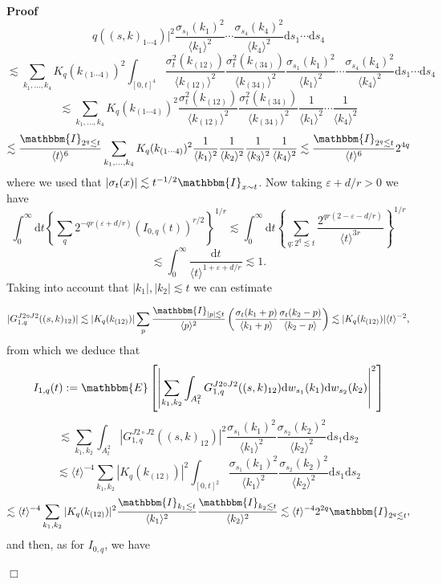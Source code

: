 \documentclass[11pt, oneside]{article}   	%
\newcommand{\assign}{:=}
\newcommand{\mathd}{\mathrm{d}}
\newenvironment{proof}{\noindent\textbf{Proof\ }}{\hspace*{\fill}$\Box$\medskip}
\begin{document}
\begin{proof}
\[{     q} ((s, k)_{1 \cdots 4}) |^2 \frac{\sigma_{s_1} (k_1)^2}{\langle k_1
     \rangle^2} \cdots \frac{\sigma_{s_4} (k_4)^2}{\langle k_4 \rangle^2}
     \mathd s_1 \cdots \mathd s_4 \]
  \[ \lesssim \sum_{k_1, \ldots, k_4} K_q (k_{(1 \cdots 4)})^2 \int_{[0, t]^4}
     \frac{\sigma_t^2 (k_{(12)})}{\langle k_{(12)} \rangle^2} \frac{\sigma_t^2
     (k_{(34)})}{\langle k_{(34)} \rangle^2} \frac{\sigma_{s_1}
     (k_1)^2}{\langle k_1 \rangle^2} \cdots \frac{\sigma_{s_4}
     (k_4)^2}{\langle k_4 \rangle^2} \mathd s_1 \cdots \mathd s_4 \]
  \[ \lesssim \sum_{k_1, \ldots, k_4} K_q (k_{(1 \cdots 4)})^2
     \frac{\sigma_t^2 (k_{(12)})}{\langle k_{(12)} \rangle^2} \frac{\sigma_t^2
     (k_{(34)})}{\langle k_{(34)} \rangle^2} \frac{1}{\langle k_1 \rangle^2}
     \cdots \frac{1}{\langle k_4 \rangle^2} \]
  \[ \lesssim \frac{\mathbbm{I}_{2^q \lesssim t}}{\langle t \rangle^6}
     \sum_{k_1, \ldots, k_4} K_q (k_{(1 \cdots 4)})^2 \frac{1}{\langle k_1
     \rangle^2} \frac{1}{\langle k_2 \rangle^2} \frac{1}{\langle k_3
     \rangle^2} \frac{1}{\langle k_4 \rangle^2} \lesssim
     \frac{\mathbbm{I}_{2^q \lesssim t}}{\langle t \rangle^6} 2^{4 q} \]
  where we used that $| \sigma_t (x) | \lesssim t^{- 1 / 2} \mathbbm{I}_{x
  \sim t}$. Now taking $\varepsilon + d / r > 0$ we have
  \[ \int^{\infty}_0 \mathd t \left\{ \sum_q 2^{- q r (\varepsilon + d / r)} 
     (I_{0, q} (t))^{r / 2} \right\}^{1 / r} \lesssim \int^{\infty}_0 \mathd t
     \left\{ \sum_{q : 2^q \lesssim t}  \frac{2^{q r (2 - \varepsilon - d /
     r)}}{\langle t \rangle^{3 r}} \right\}^{1 / r} \]
  \[ \lesssim \int^{\infty}_0 \frac{\mathd t}{\langle t \rangle^{1 +
     \varepsilon + d / r}} \lesssim 1. \]
  Taking into account that $| k_1 |, | k_2 | \lesssim t$ we can estimate
  
  
  \[ | G^{J 2 \circ J 2}_{1, q} ((s, k)_{12}) | \lesssim | K_q (k_{(12)}) |
     \sum_p \frac{\mathbbm{I}_{| p | \lesssim t}}{\langle p \rangle^2} \left(
     \frac{\sigma_t (k_1 + p)}{\langle k_1 + p \rangle} \frac{\sigma_t (k_2 -
     p)}{\langle k_2 - p \rangle} \right) \lesssim | K_q (k_{(12)}) | \langle
     t \rangle^{- 2}, \]
  from which we deduce that
  \[ I_{1, q} (t) \assign \mathbbm{E} \left[ \left| \sum_{k_1, k_2}
     \int_{A_t^2} G^{J 2 \circ J 2}_{1, q} ((s, k)_{12}) \mathd w_{s_1} (k_1)
     \mathd w_{s_2} (k_2) \right|^2 \right] \]
  \[ \lesssim \sum_{k_1, k_2} \int_{A_t^2} | G^{J 2 \circ J 2}_{1, q} ((s,
     k)_{12}) |^2 \frac{\sigma_{s_1} (k_1)^2}{\langle k_1 \rangle^2}
     \frac{\sigma_{s_2} (k_2)^2}{\langle k_2 \rangle^2} \mathd s_1 \mathd s_2
  \]
  \[ \lesssim \langle t \rangle^{- 4} \sum_{k_1, k_2} | K_q (k_{(12)}) |^2
     \int_{[0, t]^2} \frac{\sigma_{s_1} (k_1)^2}{\langle k_1 \rangle^2}
     \frac{\sigma_{s_2} (k_2)^2}{\langle k_2 \rangle^2} \mathd s_1 \mathd s_2
  \]
  \[ \lesssim \langle t \rangle^{- 4} \sum_{k_1, k_2} | K_q (k_{(12)}) |^2
     \frac{\mathbbm{I}_{k_1 \lesssim t}}{\langle k_1 \rangle^2}
     \frac{\mathbbm{I}_{k_2 \lesssim t}}{\langle k_2 \rangle^2} \lesssim
     \langle t \rangle^{- 4} 2^{2 q} \mathbbm{I}_{2^q \lesssim t}, \]
  and then, as for $I_{0, q}$, we have
  

\end{proof}
\end{document}
